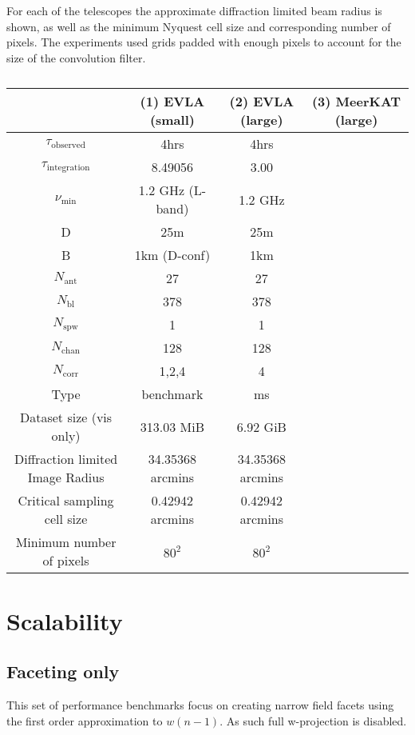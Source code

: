 For each of the telescopes the approximate diffraction limited beam radius is shown, as well as the minimum Nyquest cell size and corresponding number of pixels. The experiments used grids padded
with enough pixels to account for the size of the convolution filter.
\begin{table}[ht]
  \centering
  \begin{tabular}[c]{|c||c|c|c|}
  \hline
  & (1) EVLA (small) & (2) EVLA (large) & (3) MeerKAT (large) \\
  \hline
  $\tau_\text{observed}$ & 4hrs & 4hrs &\\
  \hline
  $\tau_\text{integration}$ & 8.49056 & 3.00 &\\
  \hline
  $\nu_\text{min}$ & 1.2 GHz (L-band) & 1.2 GHz &\\
  \hline
  D & 25m & 25m &\\
  \hline
  B & 1km (D-conf) & 1km &\\
  \hline
  $N_\text{ant}$ & 27 & 27 &\\
  \hline
  $N_\text{bl}$ & 378 & 378 &\\
  \hline
  $N_\text{spw}$ & 1 & 1 &\\
  \hline
  $N_\text{chan}$ & 128 & 128 &\\
  \hline
  $N_\text{corr}$ & 1,2,4 & 4 &\\
  \hline
  Type & benchmark & ms &\\
  \hline
  Dataset size (vis only) & 313.03 MiB & 6.92 GiB &\\
  \hline
  Diffraction limited Image Radius & 34.35368 arcmins & 34.35368 arcmins &\\
  \hline
  Critical sampling cell size & 0.42942 arcmins & 0.42942 arcmins &\\
  \hline
  Minimum number of pixels & $80^2$ & $80^2$ &\\
  \hline
  \end{tabular}
  \caption[]{}
  \label{tbl_datasets}
\end{table}
\section{Scalability}
\subsection{Faceting only}
This set of performance benchmarks focus on creating narrow field facets using the first order approximation to $w(n-1)$. As such full w-projection is disabled.

